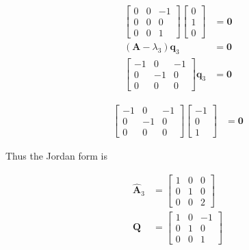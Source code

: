 \begin{itemize}
\begin{align*}
  \begin{bmatrix}
     0 & 0 & -1 \\
     0 & 0 & 0 \\
    0 & 0 & 1
    \end{bmatrix}
    \begin{bmatrix}
     0 \\ 1 \\ 0
    \end{bmatrix}
    &= \mathbf{0}
\end{align*}
\begin{align*}
 (\mathbf{A}-\lambda_3) \mathbf{q}_3 &= \mathbf{0}\\
 \begin{bmatrix}
     -1 & 0 & -1 \\
     0 & -1 & 0 \\
    0 & 0 & 0
    \end{bmatrix}\mathbf{q}_3 &= \mathbf{0}
\end{align*}

\begin{align*}
  \begin{bmatrix}
      -1 & 0 & -1 \\
     0 & -1 & 0 \\
    0 & 0 & 0
    \end{bmatrix}
    \begin{bmatrix}
     -1 \\ 0 \\1
    \end{bmatrix}
    &= \mathbf{0}
\end{align*}


 Thus the Jordan form is

 \begin{align*}
 \hat{\mathbf{A}}_3 &= \begin{bmatrix}
                        1 & 0 &0\\0 & 1 & 0\\0 & 0&2
                       \end{bmatrix}\\
  \mathbf{Q} &= \begin{bmatrix}
   1 & 0 & -1\\
   0 & 1 & 0\\
   0 & 0 &1
  \end{bmatrix}
 \end{align*}



\end{itemize}
